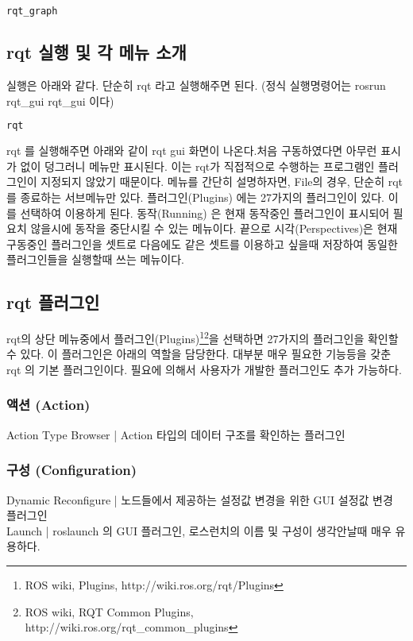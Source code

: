 \begin{lstlisting}[language=bash]
rqt_graph
\end{lstlisting}

\subsection{rqt 실행 및 각 메뉴 소개}

실행은 아래와 같다. 단순히 rqt 라고 실행해주면 된다. (정식 실행명령어는 rosrun rqt\_gui rqt\_gui 이다)

\begin{lstlisting}[language=bash]
rqt
\end{lstlisting}

rqt 를 실행해주면 아래와 같이 rqt gui 화면이 나온다.처음 구동하였다면 아무런 표시가 없이 덩그러니 메뉴만 표시된다. 이는 rqt가 직접적으로 수행하는 프로그램인 플러그인이 지정되지 않았기 때문이다. 메뉴를 간단히 설명하자면, File의 경우, 단순히 rqt를 종료하는 서브메뉴만 있다. 플러그인(Plugins) 에는 27가지의 플러그인이 있다. 이를 선택하여 이용하게 된다. 동작(Running) 은 현재 동작중인 플러그인이 표시되어 필요치 않을시에 동작을 중단시킬 수 있는 메뉴이다. 끝으로 시각(Perspectives)은 현재 구동중인 플러그인을 셋트로 다음에도 같은 셋트를 이용하고 싶을때 저장하여 동일한 플러그인들을 실행할때 쓰는 메뉴이다.

\subsection{rqt 플러그인}

rqt의 상단 메뉴중에서 플러그인(Plugins)\footnote{ROS wiki, Plugins, http://wiki.ros.org/rqt/Plugins}\footnote{ROS wiki, RQT Common Plugins, http://wiki.ros.org/rqt\_common\_plugins}을 선택하면 27가지의 플러그인을 확인할 수 있다. 이 플러그인은 아래의 역할을 담당한다. 대부분 매우 필요한 기능등을 갖춘 rqt 의 기본 플러그인이다. 필요에 의해서 사용자가 개발한 플러그인도 추가 가능하다.

\subsubsection{액션 (Action)}
Action Type Browser | Action 타입의 데이터 구조를 확인하는 플러그인 
\subsubsection{구성 (Configuration)}
Dynamic Reconfigure | 노드들에서 제공하는 설정값 변경을 위한 GUI 설정값 변경 플러그인\\
Launch | roslaunch 의 GUI 플러그인, 로스런치의 이름 및 구성이 생각안날때 매우 유용하다.\\
